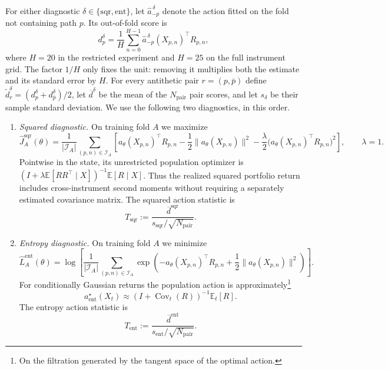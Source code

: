 \documentclass[11pt]{article}
\newcommand{\E}{\mathbb E}
\newcommand{\abs}[1]{\lvert #1\rvert}
\theoremstyle{plain}
\theoremstyle{definition}
\theoremstyle{remark}
\begin{document}
For either diagnostic $\delta\in\{\mathrm{sqr},\mathrm{ent}\}$, let
$\widehat a_{-p}^{\,\delta}$ denote the action fitted on the fold not
containing path $p$.  Its out-of-fold score is
\begin{equation}\label{eq:numerics-action-path-score}
  d_p^\delta
  =\frac1H\sum_{n=0}^{H-1}
    \widehat a_{-p}^{\,\delta}(X_{p,n})^\top R_{p,n},
\end{equation}
where $H=20$ in the restricted experiment and $H=25$ on the full instrument
grid.  The factor $1/H$ only fixes the unit: removing it multiplies both the
estimate and its standard error by $H$.  For every antithetic pair
$r=(p,\bar p)$ define
$\widetilde d_r^\delta=(d_p^\delta+d_{\bar p}^\delta)/2$, let
$\overline d^\delta$ be the mean of the $N_{\mathrm{pair}}$ pair scores, and
let $s_\delta$ be their sample standard deviation.  We use the following two
diagnostics, in this order.

\begin{enumerate}[label=(\roman*)]
\item \emph{Squared diagnostic.}
  On training fold $A$ we maximize
  \begin{equation}\label{eq:numerics-squared-objective}
    \widehat J_A^{\mathrm{sqr}}(\theta)
    =\frac{1}{\abs{\mathcal I_A}}
      \sum_{(p,n)\in\mathcal I_A}
      \left[
        a_\theta(X_{p,n})^\top R_{p,n}
        -\frac12\lVert a_\theta(X_{p,n})\rVert^2
        -\frac{\lambda}{2}
          \bigl(a_\theta(X_{p,n})^\top R_{p,n}\bigr)^2
      \right],
      \qquad \lambda=1.
  \end{equation}
  Pointwise in the state, its unrestricted population optimizer is
  $(I+\lambda\E[RR^\top\mid X])^{-1}\E[R\mid X]$.  Thus the realized squared
  portfolio return includes cross-instrument second moments without requiring
  a separately estimated covariance matrix.  The squared action statistic is
  \begin{equation}\label{eq:numerics-t-sqr}
    T_{\mathrm{sqr}}
    :=\frac{\overline d^{\mathrm{sqr}}}
      {s_{\mathrm{sqr}}/\sqrt{N_{\mathrm{pair}}}}.
  \end{equation}

\item \emph{Entropy diagnostic.}
  On training fold $A$ we minimize
  \begin{equation}\label{eq:numerics-entropy-objective}
    \widehat L_A^{\mathrm{ent}}(\theta)
    =\log\!\left[
      \frac{1}{\abs{\mathcal I_A}}
      \sum_{(p,n)\in\mathcal I_A}
      \exp\!\left(
        -a_\theta(X_{p,n})^\top R_{p,n}
        +\frac12\lVert a_\theta(X_{p,n})\rVert^2
      \right)
    \right].
  \end{equation}
  For conditionally Gaussian returns the population action is
  approximately\footnote{On the filtration generated by the tangent space of
  the optimal action.}
  \[
    a_{\mathrm{ent}}^\star(X_t)
    \approx (I+\operatorname{Cov}_t(R))^{-1}\E_t[R].
  \]
  The entropy action statistic is
  \begin{equation}\label{eq:numerics-t-ent}
    T_{\mathrm{ent}}
    :=\frac{\overline d^{\mathrm{ent}}}
      {s_{\mathrm{ent}}/\sqrt{N_{\mathrm{pair}}}}.
  \end{equation}
\end{enumerate}
\end{document}
